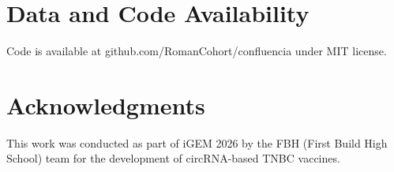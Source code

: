 \documentclass[12pt]{article}
\begin{document}
\section{Data and Code Availability}

Code is available at github.com/RomanCohort/confluencia under MIT license.

\section{Acknowledgments}

This work was conducted as part of iGEM 2026 by the FBH (First Build High School) team for the development of circRNA-based TNBC vaccines.



\end{document}

